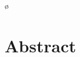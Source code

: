 ø\chapter*{Abstract}
\begin{comment}
Brightest cluster galaxies (BCGs) are the most massive and luminous galaxies located near the center of relaxed, virialized, and undisturbed galaxy clusters in the local Universe (\cite{1976ApJ...205..688S}; \cite{2010MNRAS.404.1231V}). 

According with several observational studies (\cite{2020MNRAS.498.2719T}) these objects experience special formation differing from galaxy evolution in general. Current theoretical models (e.g., \cite{2007MNRAS.375....2D}, \cite{2019ApJ...881..150C}) predict that the dry mergers are the dominant mechanisms responsible for their mass assembly.

Often, these objects are observed to host a super-massive black hole (SMBH) in their center (\cite{2006ApJ...652..216R}).  
The process of matter accretion into these SMBHs may release a large amount of energy, resulting in Active Galactic Nuclei (AGN).
There are two primary modes in which SMBH accretion can occur: the so-called 'radio mode' and the 'quasar mode'
The quasar mode consists in a high accretion rate of the SMBH via an optically-thick and geometrically-thin disk, and most of the energy is released in form of radiation. In a radio mode scenario, the SMBH accretion of hotter gas happens with a low rate in a optically-thin and geometrically-thick disk configuration, releasing energy in form of relativistic particles. The latter is typically observed in BCG. 


Therefore, in this thesis i present an analysis of Optical and Radio Loud AGN fractions on 2 galaxy samples derived from the combination of the galaxy sample created by the MPA-JHU team in the context of  "The Sloan Digital Sky Survey" ( SDSS ),  the C4 BCGs catalogue by \cite{2005AJ....130..968M}, and the Radio Emitters catalogue developed by \cite{2005MNRAS.362....9B}.

As the Optical activity is classified through the BPT diagram diagnostic, the sample without the BCGs has been obtained by overlapping space regions covered by both the SDSS survey and the Radio Emitters one, to achieve a proper confrontation between the results in the different samples.


\end{comment}
